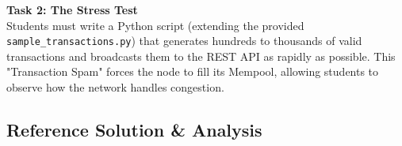 \textbf{Task 2: The Stress Test} \\
Students must write a Python script (extending the provided \texttt{sample\_transactions.py}) that generates hundreds to thousands of valid transactions and broadcasts them to the REST API as rapidly as possible. This "Transaction Spam" forces the node to fill its Mempool, allowing students to observe how the network handles congestion.

\subsection{Reference Solution \& Analysis}


    


    
        

